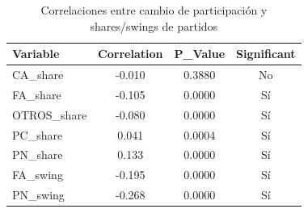 \begin{table}
\caption{Correlaciones entre cambio de participación y shares/swings de partidos}
\label{tab:turnout_correlations}
\begin{tabular}{lccc}
\toprule
Variable & Correlation & P_Value & Significant \\
\midrule
CA_share & -0.010 & 0.3880 & No \\
FA_share & -0.105 & 0.0000 & Sí \\
OTROS_share & -0.080 & 0.0000 & Sí \\
PC_share & 0.041 & 0.0004 & Sí \\
PN_share & 0.133 & 0.0000 & Sí \\
FA_swing & -0.195 & 0.0000 & Sí \\
PN_swing & -0.268 & 0.0000 & Sí \\
\bottomrule
\end{tabular}
\end{table}
